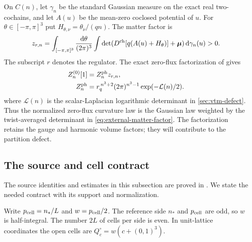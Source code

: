 On $C(n)$, let $\gamma_n$ be the standard Gaussian measure
on the exact real two-cochains, and let $A(u)$ be the
mean-zero coclosed potential of $u$.
For $\theta\in[-\pi,\pi]^3$ put
$H_{\theta,\nu}=\theta_\nu/(qn)$. The matter factor is
\begin{equation}\label{eq:external-matter-factor}
 z_{r,n}=\int_{[-\pi,\pi]^3}\frac{\mathrm d\theta}{(2\pi)^3}
     \int\det(D^{\rm ch}[q(A(u)+H_\theta)]
                     +\boldsymbol\mu)\,\mathrm d\gamma_n(u)>0.
\end{equation}
The subscript $r$ denotes the regulator. The exact zero-flux
factorization of \cite[\S3.4]{ReferenceResponse} gives
\begin{align}
 Z_n^{(0)}[1]&=Z_n^{\rm ph}z_{r,n},
                     \label{eq:external-zero-factorization}\\
 Z_n^{\rm ph}&=r_q^{\,n^3+2}(2\pi)^{n^3-1}
                         \exp(-\mathcal L(n)/2).
                     \label{eq:external-photon-factor}
\end{align}
where $\mathcal L(n)$ is the scalar-Laplacian logarithmic
determinant in \cref{sec:vtm-defect}.
Thus the normalized zero-flux curvature law is the Gaussian
law weighted by the twist-averaged determinant in
\eqref{eq:external-matter-factor}. The factorization retains
the gauge and harmonic volume factors; they will contribute
to the partition defect.

\subsection{The source and cell contract}\label{sec:reference-cells}

The source identities and estimates in this subsection are
proved in \cite[\S2]{ReferenceResponse}. We state the needed
contract with its support and normalization.

Write $p_{\rm cell}=n_*/L$ and $w=p_{\rm cell}/2$.
The reference side $n_*$ and $p_{\rm cell}$ are odd,
so $w$ is half-integral. The number $2L$ of cells per
side is even. In unit-lattice coordinates the open cells
are $Q_c^\circ=w(c+(0,1)^3)$.

